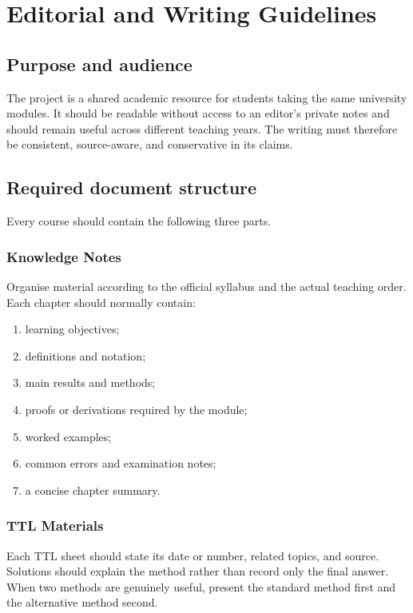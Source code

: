 \chapter{Editorial and Writing Guidelines}

\section{Purpose and audience}

The project is a shared academic resource for students taking the same university
modules. It should be readable without access to an editor's private notes and should
remain useful across different teaching years. The writing must therefore be
consistent, source-aware, and conservative in its claims.

\section{Required document structure}

Every course should contain the following three parts.

\subsection{Knowledge Notes}
Organise material according to the official syllabus and the actual teaching order.
Each chapter should normally contain:
\begin{enumerate}
  \item learning objectives;
  \item definitions and notation;
  \item main results and methods;
  \item proofs or derivations required by the module;
  \item worked examples;
  \item common errors and examination notes;
  \item a concise chapter summary.
\end{enumerate}

\subsection{TTL Materials}
Each TTL sheet should state its date or number, related topics, and source. Solutions
should explain the method rather than record only the final answer. When two methods
are genuinely useful, present the standard method first and the alternative method
second.

